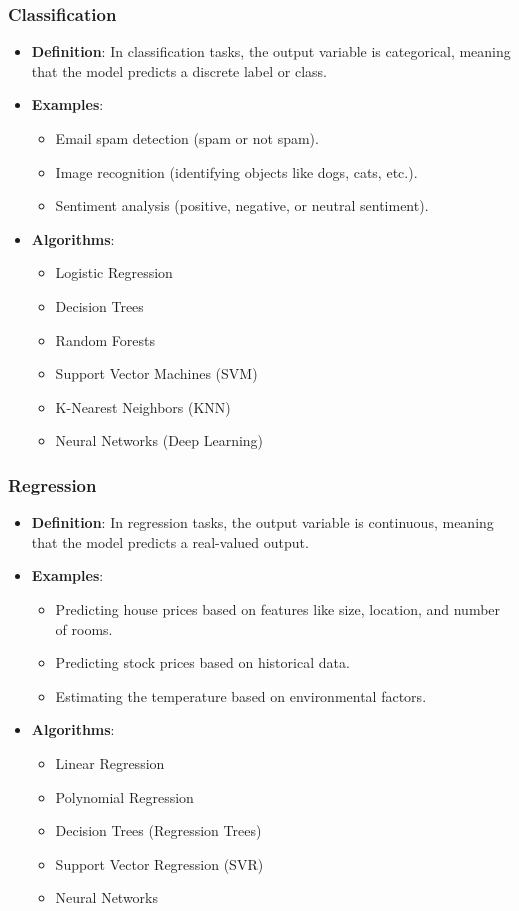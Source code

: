\subsubsection*{Classification}
\begin{itemize}
    \item \textbf{Definition}: In classification tasks, the output variable is categorical, meaning that the model predicts a discrete label or class.
    \item \textbf{Examples}:
    \begin{itemize}
        \item Email spam detection (spam or not spam).
        \item Image recognition (identifying objects like dogs, cats, etc.).
        \item Sentiment analysis (positive, negative, or neutral sentiment).
    \end{itemize}
    \item \textbf{Algorithms}:
    \begin{itemize}
        \item Logistic Regression
        \item Decision Trees
        \item Random Forests
        \item Support Vector Machines (SVM)
        \item K-Nearest Neighbors (KNN)
        \item Neural Networks (Deep Learning)
    \end{itemize}
\end{itemize}

\subsubsection*{Regression}
\begin{itemize}
    \item \textbf{Definition}: In regression tasks, the output variable is continuous, meaning that the model predicts a real-valued output.
    \item \textbf{Examples}:
    \begin{itemize}
        \item Predicting house prices based on features like size, location, and number of rooms.
        \item Predicting stock prices based on historical data.
        \item Estimating the temperature based on environmental factors.
    \end{itemize}
    \item \textbf{Algorithms}:
    \begin{itemize}
        \item Linear Regression
        \item Polynomial Regression
        \item Decision Trees (Regression Trees)
        \item Support Vector Regression (SVR)
        \item Neural Networks
    \end{itemize}
\end{itemize}

